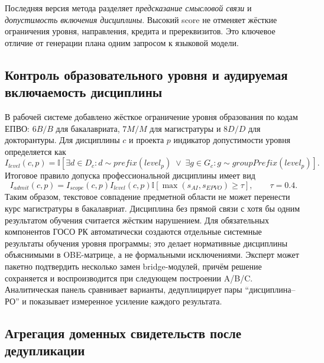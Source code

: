 \documentclass[twoside,11pt]{article}
\begin{document}
Последняя версия метода разделяет \emph{предсказание смысловой связи} и
\emph{допустимость включения дисциплины}. Высокий score не отменяет жёсткие
ограничения уровня, направления, кредита и пререквизитов. Это ключевое отличие
от генерации плана одним запросом к языковой модели.

\subsection{Контроль образовательного уровня и аудируемая включаемость дисциплины}

В рабочей системе добавлено жёсткое ограничение уровня образования по кодам
ЕПВО: $6B/B$ для бакалавриата, $7M/M$ для магистратуры и $8D/D$ для
докторантуры. Для дисциплины $c$ и проекта $p$ индикатор допустимости уровня
определяется как
\begin{equation}
I_{level}(c,p)=\mathbb{I}\left[\exists d\in D_c:d\sim prefix(level_p)\;\lor\;
\exists g\in G_c:g\sim groupPrefix(level_p)\right].
\end{equation}
Итоговое правило допуска профессиональной дисциплины имеет вид
\begin{equation}
I_{admit}(c,p)=I_{scope}(c,p)I_{level}(c,p)
\mathbb{I}\left[\max(s_{AI},s_{EPVO})\geq\tau\right],\qquad \tau=0.4.
\label{eq:admission}
\end{equation}
Таким образом, текстовое совпадение предметной области не может перенести курс
магистратуры в бакалавриат. Дисциплина без прямой связи с хотя бы одним
результатом обучения считается жёстким нарушением. Для обязательных компонентов
ГОСО РК автоматически создаются отдельные системные результаты обучения уровня
программы; это делает нормативные дисциплины объяснимыми в OBE-матрице, а не
формальными исключениями. Эксперт может пакетно подтвердить несколько замен
bridge-модулей, причём решение сохраняется и воспроизводится при следующем
построении A/B/C. Аналитическая панель сравнивает варианты, дедуплицирует пары
``дисциплина--РО'' и показывает измеренное усиление каждого результата.

\subsection{Агрегация доменных свидетельств после дедупликации}
\end{document}
